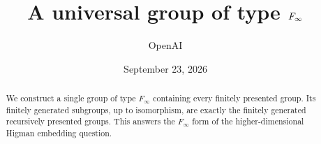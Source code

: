 \documentclass[11pt]{article}
\title{A universal group of type $\Finfty$}
\author{OpenAI}
\date{September 23, 2026}
\newcommand{\Finfty}{F_\infty}
\theoremstyle{definition}
\theoremstyle{remark}
\numberwithin{equation}{section}
\begin{document}
\maketitle
\begin{abstract}
We construct a single group of type $\Finfty$ containing every finitely
presented group. Its finitely generated subgroups, up to isomorphism, are
exactly the finitely generated recursively presented groups. This answers
the $\Finfty$ form of the higher-dimensional Higman embedding question.
\end{abstract}










\end{document}
